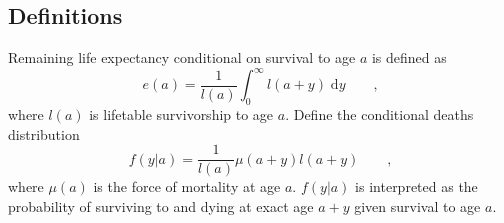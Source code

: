 \documentclass{article}
\newcommand{\dd}{\; \mathrm{d}}
\newcommand{\tc}{\quad\quad\text{,}}
\begin{document}
\subsection*{Definitions}

Remaining life expectancy conditional on survival to age $a$ is defined as
\begin{equation}
e(a) = \frac{1}{l(a)}\int_0^\infty l(a+y) \dd y \tc
\end{equation}
where $l(a)$ is lifetable survivorship to age $a$.
Define the
conditional deaths distribution
\begin{equation}
\label{eq:fya}
f(y|a) = \frac{1}{l(a)} \mu(a+y) l(a+y) \tc
\end{equation}
where $\mu(a)$ is the force of mortality at age $a$. $f(y|a)$ is interpreted as
the probability of surviving to and dying at exact age $a+y$ given survival to
age $a$.
\end{document}
